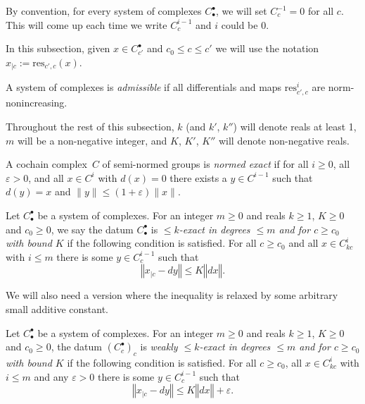 By convention, for every system of complexes $C_\bullet^\bullet$,
we will set $C^{-1}_c = 0$ for all $c$.
This will come up each time we write $C^{i-1}_c$ and $i$ could be $0$.

In this subsection, given $x ∈ C^•_{c'}$ and $c_0\leq c ≤ c'$ we will use the notation
$x_{|c} := \mathrm{res}_{c', c}(x)$.

\begin{definition}
  \label{admissible}
  \leanok
  A system of complexes is \emph{admissible}
  if all differentials and maps $\mathrm{res}_{c',c}^i$ are norm-nonincreasing.
\end{definition}

Throughout the rest of this subsection, $k$ (and $k'$, $k''$) will denote reals at least 1,
$m$ will be a non-negative integer, and $K$, $K'$, $K''$ will denote non-negative reals.

\begin{definition}
  \label{norm_exact_complex}
  \leanok
  A cochain complex~$C$ of semi-normed groups is \emph{normed exact} if
  for all $i \ge 0$, all $\varepsilon > 0$, and all $x \in C^i$ with $d(x) = 0$
  there exists a $y \in C^{i-1}$ such that $d(y) = x$ and $\|y\| \le (1 + \varepsilon)\|x\|$.
\end{definition}

\begin{definition}
  \label{is_bounded_exact}
  \leanok
  Let $C_\bullet^\bullet$ be a system of complexes.
  For an integer $m\geq 0$ and reals $k \ge 1$, $K \ge 0$ and $c_0 \ge 0$,
  we say the datum $C_\bullet^\bullet$ is
  \emph{$\leq k$-exact in degrees $\leq m$ and for $c\geq c_0$ with bound $K$} if the following condition is satisfied.
  For all $c\geq c_0$ and all $x\in C_{kc}^i$ with $i\leq m$
  there is some $y\in C_c^{i-1}$ such that
  \[
    ‖x_{|c} - dy‖ ≤ K ‖dx‖.
  \]
\end{definition}

We will also need a version where the inequality is relaxed by some arbitrary small additive constant.

\begin{definition}
  \label{is_weak_bounded_exact}
  \leanok
  Let $C_\bullet^\bullet$ be a system of complexes.
  For an integer $m\geq 0$ and reals $k \ge 1$, $K \ge 0$ and $c_0 \ge 0$,
  the datum $(C_c^\bullet)_c$ is
  \emph{weakly $\leq k$-exact in degrees $\leq m$ and for $c\geq c_0$ with bound $K$} if the following condition is satisfied.
  For all $c\geq c_0$, all $x\in C_{kc}^i$ with $i\leq m$ and any $ε > 0$
  there is some $y\in C_c^{i-1}$ such that
  \[
    ‖x_{|c} - dy‖ ≤ K ‖dx‖ + ε.
  \]
\end{definition}

